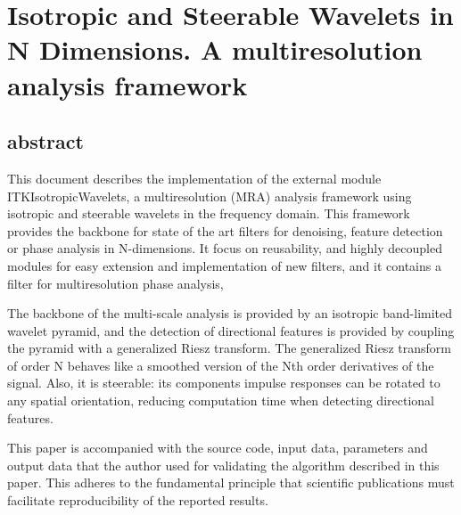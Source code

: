 
\chapter{Isotropic and Steerable Wavelets in N Dimensions. A multiresolution analysis framework}

\label{Chapter-Wavelets} %


\section{abstract}
\noindent
This document describes the implementation of the external module ITKIsotropicWavelets, a multiresolution (MRA) analysis framework using isotropic and steerable wavelets in the frequency domain. This framework provides the backbone for state of the art filters for denoising, feature detection or phase analysis in N-dimensions. It focus on reusability, and highly decoupled modules for easy extension and implementation of new filters, and it contains a filter for multiresolution phase analysis,

The backbone of the multi-scale analysis is provided by an isotropic band-limited wavelet pyramid, and the detection of directional features is provided by coupling the pyramid with a generalized Riesz transform.
The generalized Riesz transform of order N behaves like a smoothed version of the Nth order derivatives of the signal. Also, it is steerable: its components impulse responses can be rotated to any spatial orientation, reducing computation time when detecting directional features.

This paper is accompanied with the source code, input data, parameters and
output data that the author used for validating the algorithm described in
this paper. This adheres to the fundamental principle that scientific
publications must facilitate reproducibility of the reported results.

